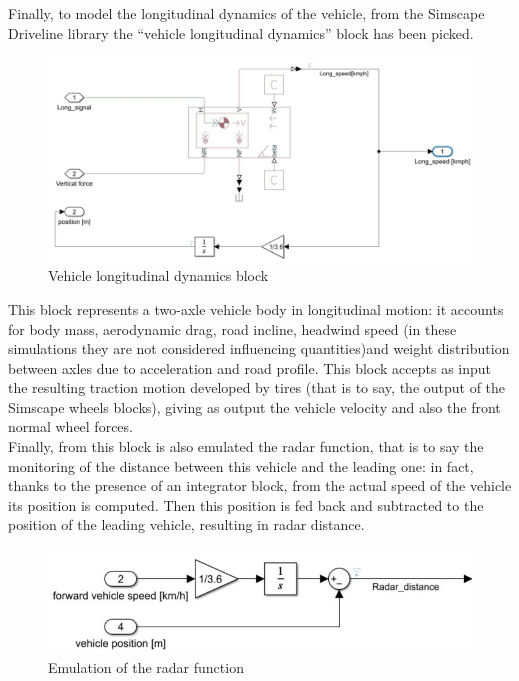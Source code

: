 \documentclass[12pt,a4paper]{report}
\begin{document}
Finally, to model the longitudinal dynamics of the vehicle, from the Simscape Driveline library the “vehicle longitudinal dynamics” block has been picked.


\begin{figure}[htbp]
	\centering
	\includegraphics[scale=0.5]{LongitudinalDynamic.jpg}
	\caption{Vehicle longitudinal dynamics block}
\end{figure}

This block represents a two-axle vehicle body in longitudinal motion: it accounts for body mass, aerodynamic drag, road incline, headwind speed (in these simulations they are not considered influencing quantities)and weight distribution between axles due to acceleration and road profile. This block accepts as input the resulting traction motion developed by tires (that is to say, the output of the Simscape wheels blocks), giving as output the vehicle velocity and also the front normal wheel forces.\\
Finally, from this block is also emulated the radar function, that is to say the monitoring of the distance between this vehicle and the leading one: in fact, thanks to the presence of an integrator block, from the actual speed of the vehicle its position is computed. Then this position is fed back and subtracted to the position of the leading vehicle, resulting in radar distance.

\begin{figure}[htbp]
	\centering
	\includegraphics{RadarFunction.jpg}
	\caption{Emulation of the radar function}
\end{figure}
\end{document}

